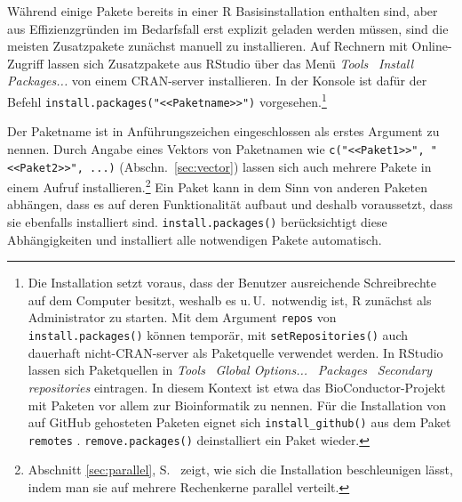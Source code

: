 Während einige Pakete bereits in einer R Basisinstallation enthalten sind, aber aus Effizienzgründen im Bedarfsfall erst explizit geladen werden müssen, sind die meisten Zusatzpakete zunächst manuell zu installieren. Auf Rechnern mit Online-Zugriff lassen sich Zusatzpakete aus RStudio über das Menü \emph{Tools} \textrightarrow\ \emph{Install Packages...} von einem CRAN-server installieren. In der Konsole ist dafür der Befehl \lstinline!install.packages("<<Paketname>>")! vorgesehen.\footnote{Die Installation setzt voraus, dass der Benutzer ausreichende Schreibrechte auf dem Computer besitzt, weshalb es u.\,U.\ notwendig ist, R zunächst als Administrator zu starten. Mit dem Argument \lstinline!repos! von \lstinline!install.packages()! können temporär, mit \lstinline!setRepositories()! auch dauerhaft nicht-CRAN-server als Paketquelle verwendet werden. In RStudio lassen sich Paketquellen in \emph{Tools} \textrightarrow\ \emph{Global Options...} \textrightarrow\ \emph{Packages} \textrightarrow\ \emph{Secondary repositories} eintragen. In diesem Kontext ist etwa das BioConductor-Projekt \cite{Gentleman2004,Huber2015} mit Paketen vor allem zur Bioinformatik zu nennen. Für die Installation von auf GitHub gehosteten Paketen eignet sich \lstinline!install_github()! aus dem Paket \lstinline!remotes! \cite{Hester2019}. \lstinline!remove.packages()! deinstalliert ein Paket wieder.}

Der Paketname ist in Anführungszeichen eingeschlossen als erstes Argument zu nennen. Durch Angabe eines Vektors von Paketnamen wie \lstinline!c("<<Paket1>>", "<<Paket2>>", ...)! (Abschn.\ \ref{sec:vector}) lassen sich auch mehrere Pakete in einem Aufruf installieren.\footnote{Abschnitt \ref{sec:parallel}, S.\ \pageref{page:par_instpack} zeigt, wie sich die Installation beschleunigen lässt, indem man sie auf mehrere Rechenkerne parallel verteilt.} Ein Paket kann in dem Sinn von anderen Paketen abhängen, dass es auf deren Funktionalität aufbaut und deshalb voraussetzt, dass sie ebenfalls installiert sind. \lstinline!install.packages()! berücksichtigt diese Abhängigkeiten und installiert alle notwendigen Pakete automatisch.


